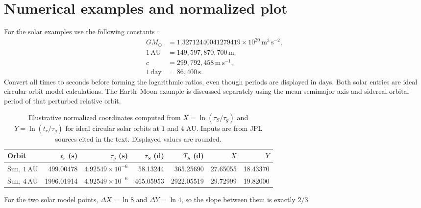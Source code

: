 \documentclass[12pt]{article}
\begin{document}
\section{Numerical examples and normalized plot}
\label{sec:examples}

For the solar examples use the following constants \cite{JPLParameters}:
\begin{align*}
  GM_\odot &= 1.32712440041279419\times10^{20}\,\mathrm{m^3\,s^{-2}},\\
  1\,\mathrm{AU} &= 149{,}597{,}870{,}700\,\mathrm{m},\\
  c &= 299{,}792{,}458\,\mathrm{m\,s^{-1}},\\
  1\,\mathrm{day} &= 86{,}400\,\mathrm{s}.
\end{align*}
Convert all times to seconds before forming the logarithmic ratios, even though periods are displayed in days. Both solar entries are ideal circular-orbit model calculations. The Earth--Moon example is discussed separately using the mean semimajor axis and sidereal orbital period of that perturbed relative orbit.

\begin{table}[ht]
  \centering
  \small
  \begin{tabular}{@{}lrrrrrr@{}}
    \toprule
    Orbit & $t_r$ (s) & $\tau_g$ (s) & $\tau_S$ (d) & $T_S$ (d) & $X$ & $Y$ \\
    \midrule
    Sun, $1\,\mathrm{AU}$ & 499.00478 & $4.92549\times10^{-6}$ & 58.13244 & 365.25690 & 27.65055 & 18.43370 \\
    Sun, $4\,\mathrm{AU}$ & 1996.01914 & $4.92549\times10^{-6}$ & 465.05953 & 2922.05519 & 29.72999 & 19.82000 \\

    \bottomrule
  \end{tabular}
  \caption{Illustrative normalized coordinates computed from $X=\ln(\tau_S/\tau_g)$ and $Y=\ln(t_r/\tau_g)$ for ideal circular solar orbits at $1$ and $4$ AU. Inputs are from JPL sources cited in the text. Displayed values are rounded.}
  \label{tab:examples}
\end{table}

For the two solar model points, $\Delta X=\ln 8$ and $\Delta Y=\ln 4$, so the slope between them is exactly $2/3$.
\end{document}
